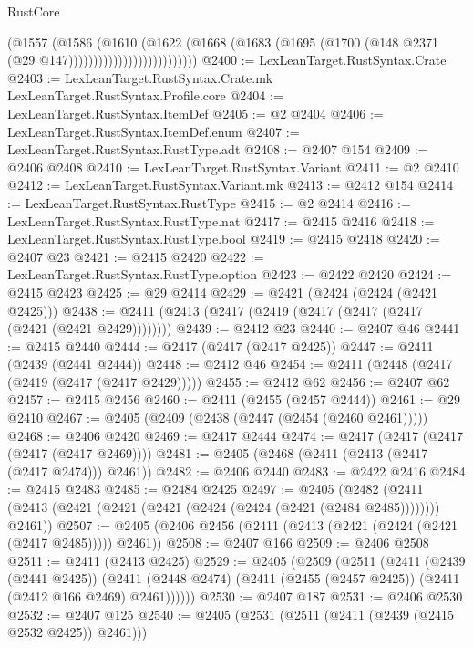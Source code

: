 \begin{lexlean}{RustCore}
\begin{coremodule}
                                    (@1557
                                      (@1586
                                        (@1610
                                          (@1622
                                            (@1668
                                              (@1683
                                                (@1695
                                                  (@1700
                                                    (@148 @2371 (@29 @147))))))))))))))))))))))))))
@2400 := LexLeanTarget.RustSyntax.Crate
@2403 := LexLeanTarget.RustSyntax.Crate.mk LexLeanTarget.RustSyntax.Profile.core
@2404 := LexLeanTarget.RustSyntax.ItemDef
@2405 := @2 @2404
@2406 := LexLeanTarget.RustSyntax.ItemDef.enum
@2407 := LexLeanTarget.RustSyntax.RustType.adt
@2408 := @2407 @154
@2409 := @2406 @2408
@2410 := LexLeanTarget.RustSyntax.Variant
@2411 := @2 @2410
@2412 := LexLeanTarget.RustSyntax.Variant.mk
@2413 := @2412 @154
@2414 := LexLeanTarget.RustSyntax.RustType
@2415 := @2 @2414
@2416 := LexLeanTarget.RustSyntax.RustType.nat
@2417 := @2415 @2416
@2418 := LexLeanTarget.RustSyntax.RustType.bool
@2419 := @2415 @2418
@2420 := @2407 @23
@2421 := @2415 @2420
@2422 := LexLeanTarget.RustSyntax.RustType.option
@2423 := @2422 @2420
@2424 := @2415 @2423
@2425 := @29 @2414
@2429 := @2421 (@2424 (@2424 (@2421 @2425)))
@2438 := @2411 (@2413 (@2417 (@2419 (@2417 (@2417 (@2417 (@2421 (@2421 @2429))))))))
@2439 := @2412 @23
@2440 := @2407 @46
@2441 := @2415 @2440
@2444 := @2417 (@2417 (@2417 @2425))
@2447 := @2411 (@2439 (@2441 @2444))
@2448 := @2412 @46
@2454 := @2411 (@2448 (@2417 (@2419 (@2417 (@2417 @2429)))))
@2455 := @2412 @62
@2456 := @2407 @62
@2457 := @2415 @2456
@2460 := @2411 (@2455 (@2457 @2444))
@2461 := @29 @2410
@2467 := @2405 (@2409 (@2438 (@2447 (@2454 (@2460 @2461)))))
@2468 := @2406 @2420
@2469 := @2417 @2444
@2474 := @2417 (@2417 (@2417 (@2417 (@2417 @2469))))
@2481 := @2405 (@2468 (@2411 (@2413 (@2417 (@2417 @2474))) @2461))
@2482 := @2406 @2440
@2483 := @2422 @2416
@2484 := @2415 @2483
@2485 := @2484 @2425
@2497 := @2405
    (@2482 (@2411 (@2413 (@2421 (@2421 (@2421 (@2424 (@2424 (@2421 (@2484 @2485)))))))) @2461))
@2507 := @2405 (@2406 @2456 (@2411 (@2413 (@2421 (@2424 (@2421 (@2417 @2485))))) @2461))
@2508 := @2407 @166
@2509 := @2406 @2508
@2511 := @2411 (@2413 @2425)
@2529 := @2405
    (@2509
      (@2511
        (@2411
          (@2439 (@2441 @2425))
          (@2411 (@2448 @2474) (@2411 (@2455 (@2457 @2425)) (@2411 (@2412 @166 @2469) @2461))))))
@2530 := @2407 @187
@2531 := @2406 @2530
@2532 := @2407 @125
@2540 := @2405 (@2531 (@2511 (@2411 (@2439 (@2415 @2532 @2425)) @2461)))

\end{coremodule}
\end{lexlean}
